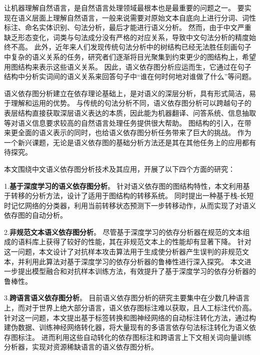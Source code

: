 \begin{cabstract}

让机器理解自然语言，是自然语言处理领域最根本也是最重要的问题之一。
要实现在语义层面上理解自然语言，一般来说需要对原始文本自底向上进行分词、词性标注、命名实体识别、句法分析，最后才能进行语义分析。
然而，由于中文严重缺乏形态变化，词类与句法成分没有严格的对应关系，导致中文句法分析的精度始终不高。
此外，近年来人们发现传统句法分析中的树结构已经无法胜任刻画句子中复杂的语义关系的任务，研究者们逐渐将目光聚集到约束更少的图结构上，希望用图结构来表示这些语义关系。
因此，语义依存图分析应运而生，它通过在句子结构中分析实词间的语义关系来回答句子中“谁在何时何地对谁做了什么”等问题。

语义依存图分析建立在依存理论基础上，是对语义的深层分析，具有形式简洁，易于理解和运用的优势。
与传统的句法分析不同，语义依存图分析可以跨越句子的表层结构直接获取深层语义表达的本质，因此能为机器翻译、问答系统、信息抽取等对语义信息要求较高的自然语言处理任务提供很大帮助。
图结构的引入，在带来更全面的语义表示的同时，也给语义依存图分析任务带来了巨大的挑战。
作为一个新兴课题，无论是语义依存图的基础分析方法还是其在其他任务上的应用都有待探究。

本文围绕中文语义依存图分析技术及其应用，开展了以下四个方面的研究：

1.\textbf{基于深度学习的语义依存图分析}。
针对语义依存图的图结构特性，本文利用基于转移的分析方法，设计了适用于图结构的转移系统。
同时提出一种基于栈-长短时记忆网络的分类器，利用当前转移状态预测下一步转移动作，从而实现了对语义依存图的自动分析。

2.\textbf{非规范文本语义依存图分析}。
尽管基于深度学习的依存分析器在规范的文本组成的语料库上获得了较好的性能，其在非规范文本上的性能却有显著下降。
针对这一问题，本文设计了对抗样本攻击算法用于生成使分析器产生误判的非规范文本，并利用此算法对基于深度学习的依存分析器的鲁棒性进行深入探究。
本文进一步提出模型融合和对抗样本训练方法，有效提升了基于深度学习的依存分析器的鲁棒性。

3.\textbf{跨语言语义依存图分析}。
目前语义依存图分析的研究主要集中在少数几种语言上，而对于世界上绝大部分语言，语义依存图标注难以获取，且人工标注代价高。
针对这一问题，本文提出基于标签转换和图神经网络的自动标注转化方法，通过构建伪数据、训练神经网络转化器，将大量现有的多语言依存句法标注转化为语义依存图标注。
进而利用这些自动转化的依存图标注和跨语言上下文相关词向量训练分析器，实现对资源稀缺语言的语义依存图分析。


\end{cabstract}
